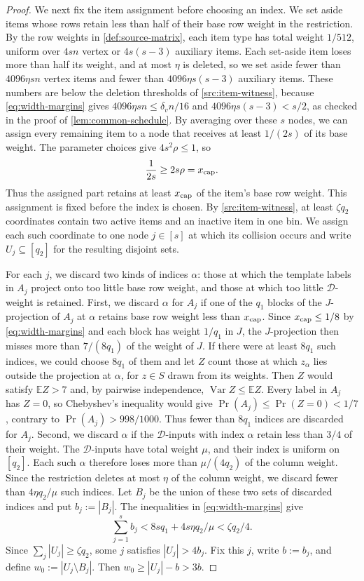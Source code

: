 \documentclass[11pt,letterpaper]{article} \usepackage[utf8]{inputenc}
\theoremstyle{plain} \newtheorem{theorem}{Theorem}[section]
\theoremstyle{definition} \newaliascnt{definition}{theorem}
\begin{document}
\begin{proof}
We next fix the item assignment before choosing an index. We set aside
items whose rows retain less than half of their base row weight in the
restriction. By the row weights in \cref{def:source-matrix}, each item type has
total weight \(1/512\), uniform over \(4sn\) vertex or \(4s(s-3)\) auxiliary
items. Each set-aside item loses more than half its weight, and at most \(\eta\)
is deleted, so we set aside fewer than \(4096\eta sn\) vertex
items and fewer than \(4096\eta s(s-3)\) auxiliary items. These numbers are below
the deletion thresholds of \cref{src:item-witness}, because \eqref{eq:width-margins}
gives \(4096\eta sn\le\delta_v n/16\) and \(4096\eta s(s-3)<s/2\), as
checked in the proof of \cref{lem:common-schedule}. By averaging over these \(s\) nodes, we can assign every remaining item to
a node that receives at least \(1/(2s)\) of its base weight. The parameter choices give
\(4s^2\rho\le1\), so
\[
\frac1{2s}\ge2s\rho=x_{\rm cap}.
\]
Thus the assigned part retains at least \(x_{\rm cap}\) of the item's base row
weight. This assignment is fixed before the index is chosen. By
\cref{src:item-witness}, at least \(\zeta q_2\) coordinates contain two active
items and an inactive item in one bin. We assign each such coordinate to one node \(j\in[s]\)
at which its collision occurs and write \(U_j\subseteq[q_2]\) for the resulting
disjoint sets.

For each \(j\), we discard two kinds of indices \(\alpha\): those at which
the template labels in \(A_j\) project onto too little base row weight, and
those at which too little $\mathcal D$-weight is retained. First, we discard
\(\alpha\) for \(A_j\) if one of the
\(q_1\) blocks of the \(J\)-projection of \(A_j\) at \(\alpha\) retains base row
weight less than \(x_{\rm cap}\). Since \(x_{\rm cap}\le1/8\) by
\eqref{eq:width-margins} and each block has weight \(1/q_1\) in \(J\), the
\(J\)-projection then misses more than \(7/(8q_1)\) of the weight of \(J\).
If there were at least $8q_1$ such indices, we could choose $8q_1$ of them and let $Z$
count those at which $z_\alpha$ lies outside the projection at $\alpha$, for $z\in S$
drawn from its weights. Then $Z$ would satisfy $\mathbb EZ>7$ and, by pairwise independence,
$\operatorname{Var}Z\le\mathbb EZ$. Every label in $A_j$ has $Z=0$, so
Chebyshev's inequality would give $\Pr(A_j)\le\Pr(Z=0)<1/7$, contrary to
$\Pr(A_j)>998/1000$. Thus fewer than \(8q_1\) indices are discarded for \(A_j\).
Second, we discard \(\alpha\) if the $\mathcal D$-inputs with index \(\alpha\)
retain less than \(3/4\) of their weight. The $\mathcal D$-inputs have total
weight \(\mu\), and their index is uniform on \([q_2]\). Each such \(\alpha\)
therefore loses more than \(\mu/(4q_2)\) of the column weight. Since the
restriction deletes at most \(\eta\) of the column weight, we discard fewer
than \(4\eta q_2/\mu\) such indices. Let \(B_j\) be the union of these two
sets of discarded indices and put \(b_j:=|B_j|\). The inequalities in
\eqref{eq:width-margins} give
\[
\sum_{j=1}^s b_j<8sq_1+4s\eta q_2/\mu<\zeta q_2/4.
\]
Since \(\sum_j|U_j|\ge\zeta q_2\), some \(j\) satisfies \(|U_j|>4b_j\). Fix this
\(j\), write \(b:=b_j\), and define \(w_0:=|U_j\setminus B_j|\). Then
\(w_0\ge|U_j|-b>3b\).


\end{proof}
\end{document}

